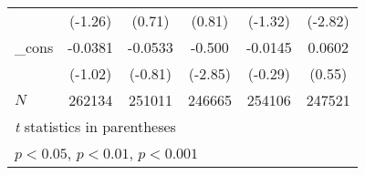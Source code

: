 {\begin{longtable}{l*{5}{c}}
            &     (-1.26)         &      (0.71)         &      (0.81)         &     (-1.32)         &     (-2.82)         \\
\_cons      &     -0.0381         &     -0.0533         &      -0.500\sym{**} &     -0.0145         &      0.0602         \\
            &     (-1.02)         &     (-0.81)         &     (-2.85)         &     (-0.29)         &      (0.55)         \\
\hline
\(N\)       &      262134         &      251011         &      246665         &      254106         &      247521         \\
\hline\hline
\multicolumn{6}{l}{\footnotesize \textit{t} statistics in parentheses}\\
\multicolumn{6}{l}{\footnotesize \sym{*} \(p<0.05\), \sym{**} \(p<0.01\), \sym{***} \(p<0.001\)}\\
\end{longtable}
\label{tab:oaxaca_female}
}
